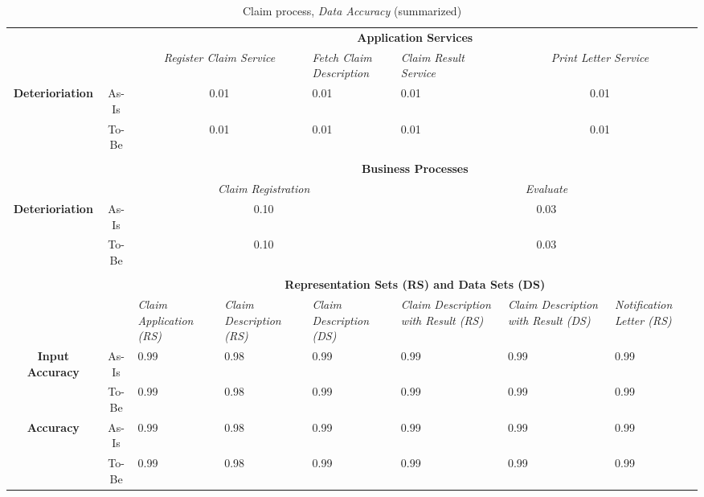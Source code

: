 \begin{center}
\begin{table}[H]
\begin{tabular}{|c|c|p{1.5cm}|p{1.5cm}|p{1.5cm}|p{1.5cm}|p{1.5cm}|p{1.7cm}|}



\cline{3-8}

	\multicolumn{2}{c|}{} & \multicolumn{6}{c|}{\textbf{Application Services}} \\ \cline{3-8}
	\multicolumn{2}{c|}{} & \multicolumn{2}{c|}{\textsl{Register Claim Service}} & \textsl{Fetch Claim Description} & \textsl{Claim Result Service} & \multicolumn{2}{c|}{\textsl{Print Letter Service}} \\ \hline
	\multirow{2}{*}{\textbf{Deterioriation}} & As-Is & \multicolumn{2}{c|}{0.01} & 0.01 & 0.01 & \multicolumn{2}{c|}{0.01} \\ \cline{2-8}
	& To-Be & \multicolumn{2}{c|}{0.01} & 0.01 & 0.01 & \multicolumn{2}{c|}{0.01} \\ \hline


	\multicolumn{8}{c}{} \\ \cline{3-8}
	\multicolumn{2}{c|}{} & \multicolumn{6}{c|}{\textbf{Business Processes}} \\ \cline{3-8}
	\multicolumn{2}{c|}{} & \multicolumn{3}{c|}{\textsl{Claim Registration}} & \multicolumn{3}{c|}{\textsl{Evaluate}} \\ \hline
	\multirow{2}{*}{\textbf{Deterioriation}} & As-Is & \multicolumn{3}{c|}{0.10} & \multicolumn{3}{c|}{0.03} \\ \cline{2-8}
	& To-Be & \multicolumn{3}{c|}{0.10} & \multicolumn{3}{c|}{0.03} \\ \hline

	\multicolumn{8}{c}{} \\ \cline{3-8}
	\multicolumn{2}{c|}{} & \multicolumn{6}{c|}{\textbf{Representation Sets (RS) and Data Sets (DS)}} \\ \cline{3-8}
	\multicolumn{2}{c|}{} & \textsl{Claim Application (RS)} & \textsl{Claim Description (RS)} & \textsl{Claim Description (DS)} & \textsl{Claim Description with Result (RS)} & \textsl{Claim Description with Result (DS)} & \textsl{Notification Letter (RS)}\\
	\hline
	\multirow{2}{*}{\textbf{Input Accuracy}} & As-Is & 0.99 & 0.98 & 0.99 & 0.99 & 0.99 & 0.99\\ \cline{3-8} \cline{2-2}
	& To-Be & 0.99 & 0.98 & 0.99 & 0.99 & 0.99 & 0.99\\ \hline
	\multirow{2}{*}{\textbf{Accuracy}} & As-Is & 0.99 & 0.98 & 0.99 & 0.99 & 0.99 & 0.99\\ \cline{3-8} \cline{2-2}
	& To-Be & 0.99 & 0.98 & 0.99 & 0.99 & 0.99 & 0.99\\ \hline


\end{tabular}
\caption{Claim process, \textsl{Data Accuracy} (summarized)}
\label{tab:claim_both}
\end{table}
\end{center}